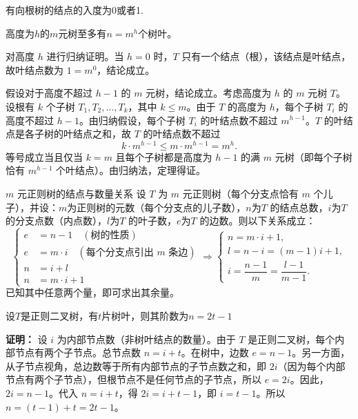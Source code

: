 \documentclass[lang=cn,11pt]{elegantbook}
\begin{document}
有向根树的结点的入度为0或者1.

\begin{theorem}
    高度为$h$的$m$元树至多有$n=m^h$个树叶。
\end{theorem}
对高度 $h$ 进行归纳证明。当 $h=0$ 时，$T$ 只有一个结点（根），该结点是叶结点，故叶结点数为 $1 = m^0$，结论成立。

假设对于高度不超过 $h-1$ 的 $m$ 元树，结论成立。考虑高度为 $h$ 的 $m$ 元树 $T$。设根有 $k$ 个子树 $T_1, T_2, \dots, T_k$，其中 $k \le m$。由于 $T$ 的高度为 $h$，每个子树 $T_i$ 的高度不超过 $h-1$。由归纳假设，每个子树 $T_i$ 的叶结点数不超过 $m^{h-1}$。$T$ 的叶结点是各子树的叶结点之和，故 $T$ 的叶结点数不超过
    \[
    k \cdot m^{h-1} \le m \cdot m^{h-1} = m^h.
    \]
等号成立当且仅当 $k=m$ 且每个子树都是高度为 $h-1$ 的满 $m$ 元树（即每个子树恰有 $m^{h-1}$ 个叶结点）。由归纳法，定理得证。
\begin{theorem}{$m$ 元正则树的结点与数量关系}
设 $T$ 为 $m$ 元正则树（每个分支点恰有 $m$ 个儿子），并设：$m$为正则树的元数（每个分支点的儿子数），$n$为$T$ 的结点总数，$i$为$T$ 的分支点数（内点数），$l$为$T$ 的叶子数，$e$为$T$ 的边数。则以下关系成立：
\[\begin{cases}
    e &= n - 1 \quad (\text{树的性质}) \\[-3pt]
    e &= m \cdot i \quad (\text{每个分支点引出 $m$ 条边}) \\[-3pt]
    n &= i + l \\[-3pt]
    n &= m \cdot i + 1
\end{cases}
\Rightarrow
\begin{cases}
    n = m \cdot i + 1,\\[-3pt]
    l = n - i = (m-1)i + 1,\\
    i = \dfrac{n-1}{m} = \dfrac{l-1}{m-1}.
\end{cases}
\]
已知其中任意两个量，即可求出其余量。
\end{theorem}
\begin{example}
    设$T$是正则二叉树，有$t$片树叶，则其阶数为$n=2t-1$
\end{example}
\textbf{证明：} 设 $i$ 为内部节点数（非树叶结点的数量）。由于 $T$ 是正则二叉树，每个内部节点有两个子节点。总节点数 $n = i + t$。在树中，边数 $e = n - 1$。另一方面，从子节点视角，总边数等于所有内部节点的子节点数之和，即 $2i$（因为每个内部节点有两个子节点），但根节点不是任何节点的子节点，所以 $e = 2i$。因此，$2i = n - 1$。代入 $n = i + t$，得 $2i = i + t - 1$，即 $i = t - 1$。所以 $n = (t - 1) + t = 2t - 1$。
\end{document}
